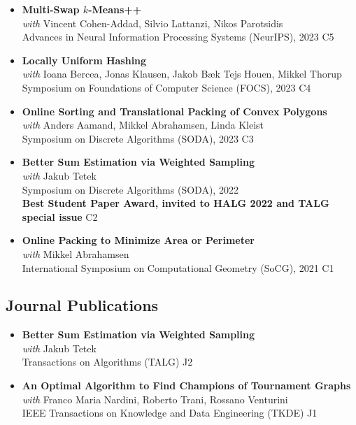 \documentclass[paper=a4,fontsize=11pt]{article} %
\begin{document}
\begin{itemize}[leftmargin=0.5em,itemsep=0.3em,label={}]
    \item \textbf{Multi-Swap $k$-Means++} \\
    \textit{with} Vincent Cohen-Addad, Silvio Lattanzi, Nikos Parotsidis \\
    Advances in Neural Information Processing Systems (NeurIPS), 2023 \hfill C5
    
    \item \textbf{Locally Uniform Hashing} \\
    \textit{with} Ioana Bercea, Jonas Klausen, Jakob Bæk Tejs Houen, Mikkel Thorup \\
    Symposium on Foundations of Computer Science (FOCS), 2023 \hfill C4
    
    \item \textbf{Online Sorting and Translational Packing of Convex Polygons} \\
    \textit{with} Anders Aamand, Mikkel Abrahamsen, Linda Kleist \\
    Symposium on Discrete Algorithms (SODA), 2023 \hfill C3

    \item \textbf{Better Sum Estimation via Weighted Sampling} \\
    \textit{with} Jakub Tetek \\ 
    Symposium on Discrete Algorithms (SODA), 2022 \\ 
    \textbf{Best Student Paper Award, invited to HALG 2022 and TALG special issue} \hfill C2
    
    \item \textbf{Online Packing to Minimize Area or Perimeter} \\
    \textit{with} Mikkel Abrahamsen \\
    International Symposium on Computational Geometry (SoCG), 2021 \hfill C1
        \end{itemize}

        \subsection*{Journal Publications}
        \begin{itemize}[leftmargin=0.5em,itemsep=0.3em,label={}]
    \item \textbf{Better Sum Estimation via Weighted Sampling} \\
    \textit{with} Jakub Tetek \\ 
    Transactions on Algorithms (TALG) \hfill J2
    
    \item \textbf{An Optimal Algorithm to Find Champions of Tournament Graphs} \\
    \textit{with} Franco Maria Nardini, Roberto Trani, Rossano Venturini \\
    IEEE Transactions on Knowledge and Data Engineering (TKDE) \hfill J1
        \end{itemize}
\end{document}
